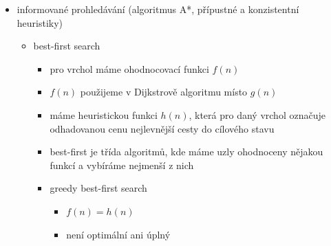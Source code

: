 \begin{itemize}
\begin{itemize}
\begin{itemize}
\item prostorová složitost $O(bm)$
\item pokud použijeme backtracking (generujeme jenom jednoho následníka místo všech), tak nám stačí dokonce jenom $O(m)$ paměti
\begin{itemize}
\item DFS využívá to, že nám stav může vrátit všechny následníky (pak je držíme v~paměti)
\item backtracking v daném vrcholu generuje jednoho následníka (takže všechny ostatní nemusíme držet v paměti)
\begin{itemize}
\item ale někdy se nedá generovat jenom jeden následník
\end{itemize}
\end{itemize}
\end{itemize}
\item rozšíření BFS o funkci určující cenu kroku (tedy cenu hrany)
\begin{itemize}
\item Dijkstrův algoritmus
\item taky se tomu říká uniform-cost search
\item $g(n)$ označuje cenu nejlevnější cesty ze startu do $n$
\item místo fronty použijeme prioritní frontu
\end{itemize}
\end{itemize}
\item informované prohledávání (algoritmus A*, přípustné a konzistentní heuristiky)
\begin{itemize}
\item best-first search
\begin{itemize}
\item pro vrchol máme ohodnocovací funkci $f(n)$
\item $f(n)$ použijeme v Dijkstrově algoritmu místo $g(n)$
\item máme heuristickou funkci $h(n)$, která pro daný vrchol označuje odhadovanou cenu nejlevnější cesty do cílového stavu
\item best-first je třída algoritmů, kde máme uzly ohodnoceny nějakou funkcí a vybíráme nejmenší z nich
\item greedy best-first search
\begin{itemize}
\item $f(n)=h(n)$
\item není optimální ani úplný
\end{itemize}

\end{itemize}
\end{itemize}
\end{itemize}
